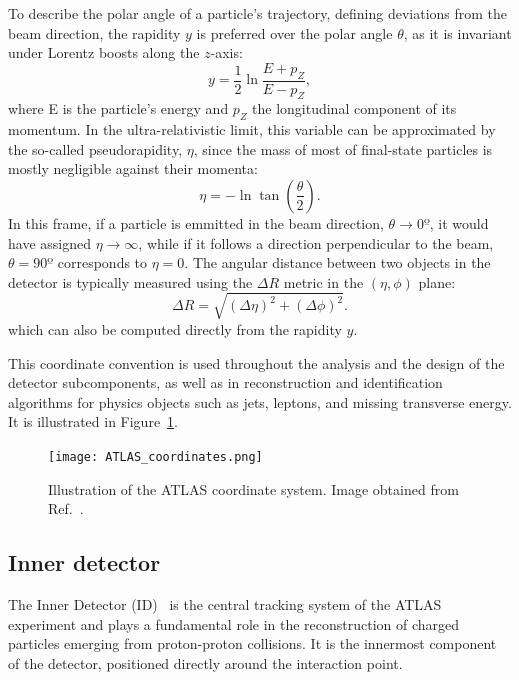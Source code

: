 To describe the polar angle of a particle’s trajectory, defining deviations from the beam direction, the rapidity $y$ is preferred over the polar angle $\theta$, as it is invariant under Lorentz boosts along the $z$-axis:
\begin{equation}
    y = \frac{1}{2}\ln{\frac{E+p_{Z}}{E-{p_{Z}}}},
\end{equation}
where E is the particle's energy and $p_{Z}$ the longitudinal component of its momentum. In the ultra-relativistic limit, this variable can be approximated by the so-called pseudorapidity, $\eta$, since the mass of most of final-state particles is mostly negligible against their momenta:
\begin{equation}
\eta = -\ln \tan \left( \frac{\theta}{2} \right).
\end{equation}
In this frame, if a particle is emmitted in the beam direction, $\theta \rightarrow 0º$, it would have assigned $\eta \rightarrow \infty$, while if it follows a direction perpendicular to the beam, $\theta = 90º$ corresponds to $\eta = 0$.
The angular distance between two objects in the detector is typically measured using the $\Delta R$ metric in the $(\eta, \phi)$ plane:
\begin{equation}
\Delta R = \sqrt{(\Delta \eta)^2 + (\Delta \phi)^2}.
\end{equation}
which can also be computed directly from the rapidity $y$.

This coordinate convention is used throughout the analysis and the design of the detector subcomponents, as well as in reconstruction and identification algorithms for physics objects such as jets, leptons, and missing transverse energy. It is illustrated in Figure~\ref{fig:coord}.
\begin{figure}[t]
    \centering
        \texttt{[image: ATLAS\_coordinates.png]}
    \caption{Illustration of the ATLAS coordinate system. Image obtained from Ref.~\cite{coordinates}.}
    \label{fig:coord}
\end{figure}

\subsection{Inner detector}
\label{sec:ID}


The Inner Detector (ID)~\cite{2010_id,ATLAS:exp} is the central tracking system of the ATLAS experiment and plays a fundamental role in the reconstruction of charged particles emerging from proton-proton collisions. It is the innermost component of the detector, positioned directly around the interaction point. 

